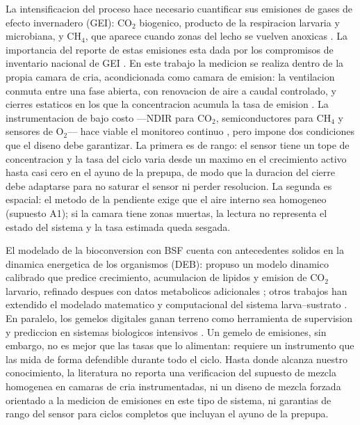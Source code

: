 La intensificacion del proceso hace necesario cuantificar sus emisiones de
gases de efecto invernadero (GEI): CO$_2$ biogenico, producto de la
respiracion larvaria y microbiana, y CH$_4$, que aparece cuando zonas del
lecho se vuelven anoxicas
\parencite{boakye-yiadomGreenhouseGasEmissions2022,
ermolaevGreenhouseGasEmissions2019,parodiBioconversionEfficienciesGreenhouse2020a,
filonchykGreenhouseGasesEmissions2024a}. La importancia del reporte de estas
emisiones esta dada por los compromisos de inventario nacional de GEI
\parencite{intergovernmentalpanelonclimatechangeipccClimateChange20212023}.
En este trabajo la medicion se realiza dentro de la propia camara de cria,
acondicionada como camara de emision: la ventilacion conmuta entre una fase
abierta, con renovacion de aire a caudal controlado, y cierres estaticos en
los que la concentracion acumula la tasa de emision
\parencite{bertinMeasuringMethaneEmissions2026}. La instrumentacion de bajo
costo ---NDIR para CO$_2$, semiconductores para CH$_4$ y sensores de
O$_2$--- hace viable el monitoreo continuo
\parencite{dubeyLowCostCO2NDIR2024,kiplimoAddressingLowCostMethane2024,
mitchellCalibrationLowCostMethane2024}, pero impone dos condiciones que el
diseno debe garantizar. La primera es de rango: el sensor tiene un tope de
concentracion y la tasa del ciclo varia desde un maximo en el crecimiento
activo hasta casi cero en el ayuno de la prepupa, de modo que la duracion
del cierre debe adaptarse para no saturar el sensor ni perder resolucion.
La segunda es espacial: el metodo de la pendiente exige que el aire interno
sea homogeneo (supuesto A1); si la camara tiene zonas muertas, la lectura no
representa el estado del sistema y la tasa estimada queda sesgada.

El modelado de la bioconversion con BSF cuenta con antecedentes solidos en
la dinamica energetica de los organismos (DEB):
\textcite{eriksenDynamicModellingFeed2022} propuso un modelo dinamico
calibrado que predice crecimiento, acumulacion de lipidos y emision de
CO$_2$ larvario, refinado despues con datos metabolicos adicionales
\parencite{eriksenMetabolicPerformanceFeed2024}; otros trabajos han
extendido el modelado matematico y computacional del sistema larva--sustrato
\parencite{katchaliMathematicalComputationalModeling2025,
grausaMetabolicModelingHermetia2023}. En paralelo, los gemelos digitales
ganan terreno como herramienta de supervision y prediccion en sistemas
biologicos intensivos \parencite{luReviewIntelligentGreenhouse2025a}. Un
gemelo de emisiones, sin embargo, no es mejor que las tasas que lo
alimentan: requiere un instrumento que las mida de forma defendible durante
todo el ciclo. Hasta donde alcanza nuestro conocimiento, la literatura no
reporta una verificacion del supuesto de mezcla homogenea en camaras de
cria instrumentadas, ni un diseno de mezcla forzada orientado a la medicion
de emisiones en este tipo de sistema, ni garantias de rango del sensor para
ciclos completos que incluyan el ayuno de la prepupa.

